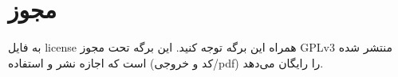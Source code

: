 \documentclass[a4paper]{article}
\begin{document}


\tableofcontents
\listoffigures
\listoftables

\section*{مجوز}

به فایل license همراه این برگه توجه کنید. این برگه تحت مجوز GPLv3 منتشر شده است
که اجازه نشر و استفاده (کد و خروجی/pdf) را رایگان می‌دهد.

\newpage

\newpage

\newpage


\end{document}
